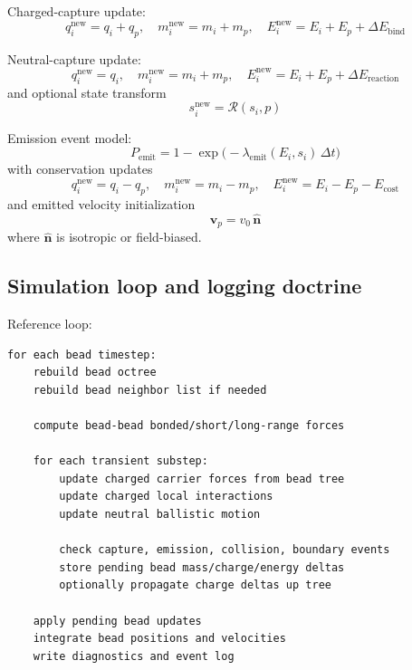 \documentclass[11pt, a4paper, oneside]{article}
\begin{document}
Charged-capture update:
\begin{equation}
q_i^{\mathrm{new}}=q_i+q_p,
\quad
m_i^{\mathrm{new}}=m_i+m_p,
\quad
E_i^{\mathrm{new}}=E_i+E_p+\Delta E_{\mathrm{bind}}
\end{equation}

Neutral-capture update:
\begin{equation}
q_i^{\mathrm{new}}=q_i,
\quad
m_i^{\mathrm{new}}=m_i+m_p,
\quad
E_i^{\mathrm{new}}=E_i+E_p+\Delta E_{\mathrm{reaction}}
\end{equation}
and optional state transform
\begin{equation}
s_i^{\mathrm{new}}=\mathcal{R}(s_i,p)
\end{equation}

Emission event model:
\begin{equation}
P_{\mathrm{emit}}=1-\exp\!\bigl(-\lambda_{\mathrm{emit}}(E_i,s_i)\,\Delta t\bigr)
\end{equation}
with conservation updates
\begin{equation}
q_i^{\mathrm{new}}=q_i-q_p,
\quad
m_i^{\mathrm{new}}=m_i-m_p,
\quad
E_i^{\mathrm{new}}=E_i-E_p-E_{\mathrm{cost}}
\end{equation}
and emitted velocity initialization
\begin{equation}
\mathbf{v}_p=v_0\,\hat{\mathbf{n}}
\end{equation}
where $\hat{\mathbf{n}}$ is isotropic or field-biased.

\subsection{Simulation loop and logging doctrine}

Reference loop:
\begin{verbatim}
for each bead timestep:
	rebuild bead octree
	rebuild bead neighbor list if needed

	compute bead-bead bonded/short/long-range forces

	for each transient substep:
		update charged carrier forces from bead tree
		update charged local interactions
		update neutral ballistic motion

		check capture, emission, collision, boundary events
		store pending bead mass/charge/energy deltas
		optionally propagate charge deltas up tree

	apply pending bead updates
	integrate bead positions and velocities
	write diagnostics and event log
\end{verbatim}
\end{document}
